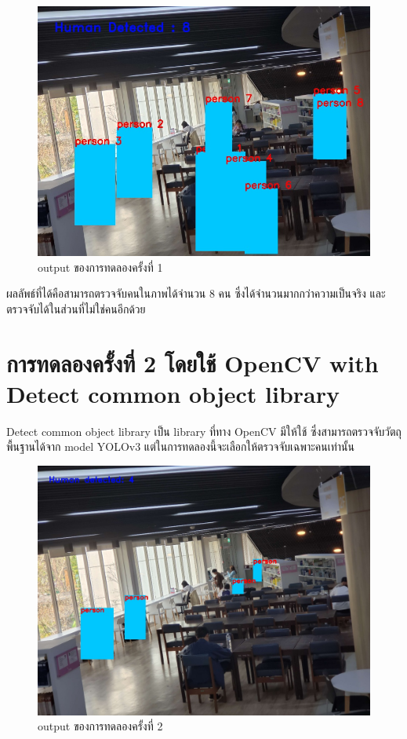 \begin{figure}[h]
    \centering
    \includegraphics[scale=0.35]{images/hog_output.jpg}
    \caption[output]{output ของการทดลองครั้งที่ 1}
    \label{fig:output1}
\end{figure}

ผลลัพธ์ที่ได้คือสามารถตรวจจับคนในภาพได้จำนวน 8 คน ซึ่งได้จำนวนมากกว่าความเป็นจริง และตรวจจับได้ในส่วนที่ไม่ใช่คนอีกด้วย

\section{การทดลองครั้งที่ 2 โดยใช้ OpenCV with Detect common object library}
\hspace{10mm}Detect common object library เป็น library ที่ทาง OpenCV มีให้ใช้ ซึ่งสามารถตรวจจับวัตถุพื้นฐานได้จาก model YOLOv3 แต่ในการทดลองนี้จะเลือกให้ตรวจจับเฉพาะคนเท่านั้น
\begin{figure}[h]
    \centering
    \includegraphics[scale=0.25]{images/cvlib_output.jpg}
    \caption[output]{output ของการทดลองครั้งที่ 2}
    \label{fig:output2}
\end{figure}

